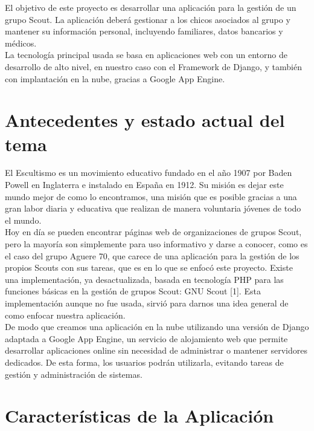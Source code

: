 El objetivo de este proyecto es desarrollar una aplicación para la gestión de un grupo
 Scout. La aplicación deberá gestionar a los chicos asociados al grupo y mantener su 
información personal, incluyendo familiares, datos bancarios y médicos.  \\

La tecnología principal usada se basa en aplicaciones web con un entorno de desarrollo de alto
nivel, en nuestro caso con el Framework de Django, y también con implantación en la nube, gracias a 
Google App Engine.
\section{Antecedentes y estado actual del tema}
\label{1:sec:1}
El Escultismo es un movimiento educativo fundado en el año 1907 por Baden Powell en Inglaterra
e instalado en España en 1912. Su misión es dejar este mundo mejor de como lo encontramos,
una misión que es posible gracias a una gran labor diaria y educativa que realizan de manera
voluntaria jóvenes de todo el mundo.\\

Hoy en día se pueden encontrar páginas web de organizaciones de grupos Scout,  pero la mayoría
son simplemente para uso informativo y darse a conocer, como es el caso del grupo Aguere 70, que carece de
una aplicación para la gestión de los propios Scouts con sus tareas, que es en lo que se enfocó este proyecto. Existe
una implementación, ya desactualizada, basada en tecnología PHP para las funciones básicas en la gestión de grupos
Scout: GNU Scout [1]. Esta implementación aunque no fue usada, sirvió para darnos una idea general
de como enfocar nuestra aplicación.\\

De modo que creamos una aplicación en la nube utilizando una versión de Django adaptada a Google 
App Engine, un servicio de alojamiento web que permite desarrollar aplicaciones online sin 
necesidad de administrar o mantener servidores dedicados. De esta forma, los usuarios podrán utilizarla, evitando 
tareas de gestión y administración de sistemas.


\section{Características de la Aplicación}
\label{1:sec:2}

